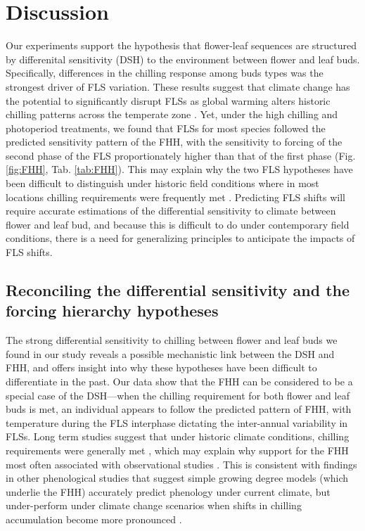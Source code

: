 \documentclass[11pt]{article}\usepackage[]{graphicx}\usepackage[]{color}
\begin{document}
\section*{Discussion}
\noindent Our experiments support the hypothesis that flower-leaf sequences are structured by differenital sensitivity (DSH) to the environment between flower and leaf buds. Specifically, differences in the chilling response among buds types was the strongest driver of FLS variation. These results suggest that climate change has the potential to significantly disrupt FLSs as global warming alters historic chilling patterns across the temperate zone \citep{Morin:2009aa}. Yet, under the high chilling and photoperiod treatments, we found that FLSs for most species followed the predicted sensitivity pattern of the FHH, with the sensitivity to forcing of the second phase of the FLS proportionately higher than that of the first phase (Fig.\ref{fig:FHH}, Tab. \ref{tab:FHH}). This may explain why the two FLS hypotheses have been difficult to distinguish under historic field conditions where in most locations chilling requirements were frequently met \citep{Gauzere2019}. 
Predicting FLS shifts will require accurate estimations of the differential sensitivity to climate between flower and leaf bud, and because this is difficult to do under contemporary field conditions, there is a need for generalizing principles to anticipate the impacts of FLS shifts.\\%

\subsection*{Reconciling the differential sensitivity and the forcing hierarchy hypotheses}

\noindent The strong differential sensitivity to chilling between flower and leaf buds we found in our study reveals a possible mechanistic link between the DSH and FHH, and offers insight into why these hypotheses have been difficult to differentiate in the past. Our data show that the FHH can be considered to be a special case of the DSH---when the chilling requirement for both flower and leaf buds is met, an individual appears to follow the predicted pattern of FHH, with temperature during the FLS interphase dictating the inter-annual variability in FLSs. Long term studies suggest that under historic climate conditions, chilling requirements were generally met \citep{Gauzere2019,Chuine:2016aa}, which may explain why support for the FHH most often associated with observational studies \citep[e.g.][]{COSMULESCU:2020aa,Guo2014}. This is consistent with findings in other phenological studies that suggest simple growing degree models (which underlie the FHH) accurately predict phenology under current climate, but under-perform under climate change scenarios when shifts in chilling accumulation become more pronounced \citep{Linkosalo2008,Chuine:2016aa}.\\ 
\end{document}
